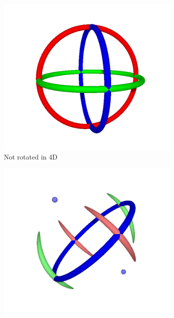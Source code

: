 \documentclass{l4proj}
\begin{document}
\begin{figure}
  \begin{subfigure}[b]{0.33\textwidth}
    \includegraphics[width=\textwidth]{images/rotation/grabball-torii.PNG}
    \caption{
      Not rotated in 4D
    }
    \label{fig:grab3}
  \end{subfigure}
  \begin{subfigure}[b]{0.33\textwidth}
    \includegraphics[width=\textwidth]{images/rotation/grabball-torii-split-2.PNG}

\end{subfigure}
\end{figure}
\end{document}
